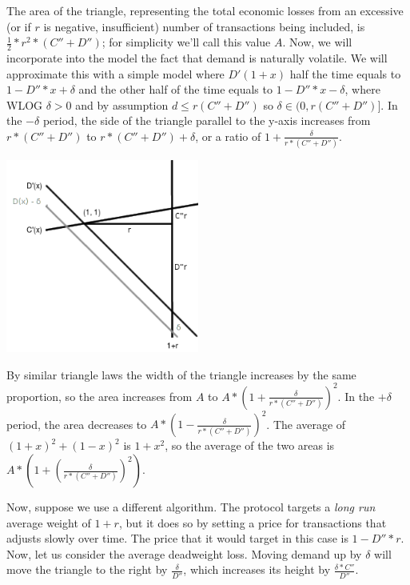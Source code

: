 \documentclass[12pt, final]{article}
\begin{document}
The area of the triangle, representing the total economic losses from an excessive (or if $r$ is negative, insufficient) number of transactions being included, is $\frac{1}{2} * r^2 * (C'' + D'')$; for simplicity we'll call this value $A$. Now, we will incorporate into the model the fact that demand is naturally volatile. We will approximate this with a simple model where $D'(1 + x)$ half the time equals to $1 - D'' * x + \delta$ and the other half of the time equals to $1 - D'' * x - \delta$, where WLOG $\delta > 0$ and by assumption $d \le r(C''+ D'')$ so $\delta \in (0, r(C'' + D'')]$. In the $-\delta$ period, the side of the triangle parallel to the y-axis increases from $r * (C'' + D'')$ to $r * (C'' + D'') + \delta$, or a ratio of $1 + \frac{\delta}{r * (C'' + D'')}$.

\begin{center}
\includegraphics[width=2.5in]{Triangle2.png} \\
\end{center}

By similar triangle laws the width of the triangle increases by the same proportion, so the area increases from $A$ to $A * (1 + \frac{\delta}{r * (C'' + D'')})^2$. In the $+\delta$ period, the area decreases to $A * (1 - \frac{\delta}{r * (C'' + D'')})^2$. The average of $(1+x)^2 + (1-x)^2$ is $1 + x^2$, so the average of the two areas is $A * (1 + (\frac{\delta}{r * (C'' + D'')})^2)$.

Now, suppose we use a different algorithm. The protocol targets a \emph{long run} average weight of $1 + r$, but it does so by setting a price for transactions that adjusts slowly over time. The price that it would target in this case is $1 - D'' * r$. Now, let us consider the average deadweight loss. Moving demand up by $\delta$ will move the triangle to the right by $\frac{\delta}{D''}$, which increases its height by $\frac{\delta * C''}{D''}$.
\end{document}
